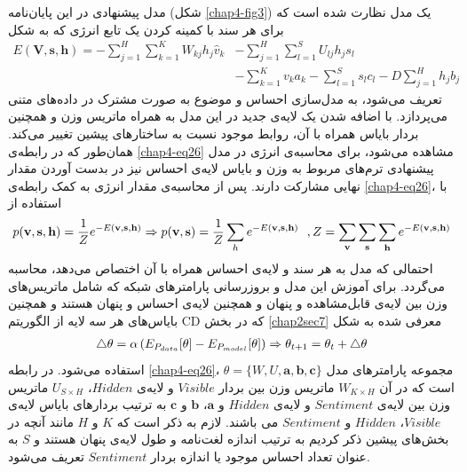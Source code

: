 مدل پیشنهادی در این پایان‌‌نامه 
(شکل \ref{chap4-fig3})
 یک مدل نظارت شده است که برای هر سند با کمینه کردن یک تابع انرژی که به شکل
\begin{align}
	\label{chap4-eq26}
	E(\textbf{V},\textbf{s},\textbf{h})=-\sum_{j=1}^{H}\sum_{k=1}^{K}W_{kj}h_j\hat{v}_{k}&-\sum_{j=1}^{H}\sum_{l=1}^{S}U_{lj}h_js_l\\\nonumber
	&-\sum_{k=1}^{K}v_{k}a_{k} -\sum_{l=1}^{S}s_lc_l- D\sum_{j=1}^{H}h_jb_j
\end{align}
تعریف می‌‌شود، به مدل‌سازی احساس و موضوع به صورت مشترک در داده‌های متنی می‌‌پردازد. با اضافه شدن یک لایه‌ی جدید در این مدل به همراه ماتریس وزن و همچنین بردار بایاس همراه با آن، روابط موجود نسبت به ساختار‌های پیشین تغییر می‌کند. همان‌طور که در رابطه‌ی
\ref{chap4-eq26}
مشاهده می‌‌شود، برای محاسبه‌ی انرژی در مدل پیشنهادی ترم‌های مربوط به وزن و بایاس لایه‌ی احساس نیز در بدست آوردن مقدار نهایی مشارکت دارند. پس از محاسبه‌ی مقدار انرژی به کمک رابطه‌ی
\ref{chap4-eq26}،
 با استفاده از
\begin{align}
	\centering
	\label{chap4-eq27}
	p(\textbf{v},\textbf{s},\textbf{h}) = \dfrac{1}{Z} e^{-E(\textbf{v},\textbf{s},\textbf{h})} \Rightarrow
	p(\textbf{v},\textbf{s}) = \dfrac{1}{Z} \sum_{h}  e^{-E(\textbf{v},\textbf{s},\textbf{h})} \ \ ,
	Z = \sum_{\textbf{v}}\sum_{\textbf{s}}\sum_{\textbf{h}} e^{-E(\textbf{v},\textbf{s},\textbf{h})} 
\end{align}
احتمالی‌ که مدل به هر سند و ‌لایه‌ی احساس همراه با آن اختصاص می‌‌دهد، محاسبه می‌‌گردد. برای آموزش این مدل و بروزرسانی پارامترهای شبکه که شامل ماتریس‌های وزن بین لایه‌ی قابل‌مشاهده و پنهان و همچنین لایه‌ی احساس و پنهان هستند و همچنین بایاس‌های هر سه‌ لایه از الگوریتم
CD
که در بخش
\ref{chap2sec7}
معرفی‌ شده به شکل
\begin{align}
	\centering
	\label{chap4-eq28}
	\triangle\theta = \alpha \left( E_{P_{data}}[\theta]-E_{P_{model}}[\theta]\right) \Rightarrow \theta_{t+1} = \theta_t + \triangle\theta
\end{align}
استفاده می‌‌شود.
در رابطه
\ref{chap4-eq26}، $\theta=\{W, U, \textbf{a}, \textbf{b}, \textbf{c} \}$
مجموعه پارامتر‌های مدل است که در آن
$W_{K \times H}$
ماتریس وزن بین بردار
$Visible$
و لایه‌ی
$Hidden$، $U_{S \times H}$
ماتریس وزن بین لایه‌ی
$Sentiment$
و لایه‌ی
$Hidden$
و
$\textbf{a}$، $\textbf{b}$
و
$\textbf{c}$
به ترتیب بردار‌های بایاس لایه‌ی
$Visible$، $Hidden$
و
$Sentiment$
می‌ باشند. لازم به ذکر است که
$K$
و
$H$
مانند آنچه در بخش‌های پیشین ذکر کردیم به ترتیب اندازه لغت‌نامه و طول لایه‌ی پنهان هستند و
$S$
به عنوان تعداد احساس موجود یا اندازه بردار
$Sentiment$
تعریف می‌‌شود.

